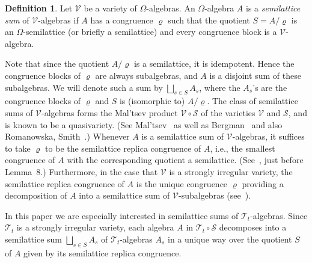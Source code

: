 \documentclass{birkau}
\def\Om{\Omega}
\newcommand{\mcV}{\mathcal{V}}
\newcommand{\mcT}{\mathcal{T}}
\newcommand{\mcS}{\mathcal{S}}
\theoremstyle{plain}
\theoremstyle{definition}
\newtheorem{definition}[theorem]{Definition}
\numberwithin{equation}{section}
\begin{document}
\begin{definition}
Let $\mcV$ be a variety of $\Omega$-algebras.
An $\Om$-algebra $A$ is a
\emph{semilattice sum} of $\mcV$-algebras if $A$ has a congruence $\varrho$ such that the
quotient $S =  A/\varrho$ is an $\Om$-semilattice (or briefly a semilattice) and every
congruence block is a $\mcV$-algebra.
\end{definition}

Note that since the quotient $A/\varrho$ is a semilattice, it is idempotent. Hence the
congruence blocks of $\varrho$ are always subalgebras, and $A$ is a disjoint sum of these
subalgebras. We will denote such a sum by $\bigsqcup_{s \in S} A_s$, where the $A_s$'s are
the congruence blocks of $\varrho$ and $S$ is (isomorphic to) $A/\varrho$. The class of
semilattice sums of $\mcV$-algebras forms the Mal'tsev product $\mcV \circ \mcS$ of the
varieties $\mcV$ and $\mcS$, and is known to be a quasivariety. (See Mal'tsev~\cite{M67,
  M71} as well as Bergman~\cite{B18} and also Romanowska, Smith~\cite[Ch.~3]{RS02}.)
Whenever $A$ is a semilattice sum of $\mcV$-algebras, it suffices to take $\varrho$ to be
the semilattice replica congruence of $A$, i.e., the smallest congruence of $A$ with the
corresponding quotient a semilattice. (See~\cite{B18}, just before Lemma~8.) Furthermore,
in the case that $\mcV$ is a strongly irregular variety, the semilattice replica
congruence of $A$ is the unique congruence $\varrho$ providing a decomposition of $A$ into
a semilattice sum of $\mcV$-subalgebras (see~\cite[\S 3.3]{RS02}).


In this paper we are especially interested in semilattice sums of $\mcT_t$-algebras. Since
$\mcT_t$ is a strongly irregular variety, each algebra $A$ in $\mcT_t \circ \mcS$
decomposes into a semilattice sum $\bigsqcup_{s \in S} A_s$ of $\mcT_t$-algebras $A_s$ in
a unique way over the quotient $S$ of $A$ given by its semilattice replica congruence.
\end{document}
